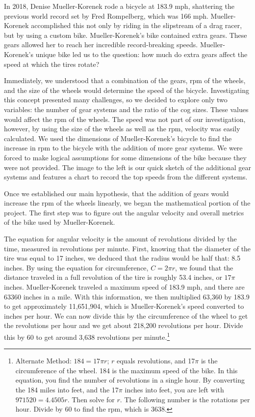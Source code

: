 In 2018, Denise Mueller-Korenek rode a bicycle at 183.9 mph, shattering the previous world record set by Fred Rompelberg, which was 166 mph. Mueller-Korenek accomplished this not only by riding in the slipstream of a drag racer, but by using a custom bike.  Mueller-Korenek’s bike contained extra gears. These gears allowed her to reach her incredible record-breaking speeds. Mueller-Korenek’s unique bike led us to the question: how much do  extra gears affect the speed at which the tires rotate?

Immediately, we understood that a combination of the gears, rpm of the wheels, and the size of the wheels would determine the speed of the bicycle. Investigating this concept presented  many challenges, so we decided to explore only two variables: the number of gear systems and  the ratio of the cog sizes. These values would affect the rpm of the wheels. The speed was not part of our investigation, however, by using the size of the wheels as well as the rpm, velocity  was easily calculated. We used the dimensions of Mueller-Korenek’s bicycle to find the increase in rpm to the bicycle with the addition of more gear systems. We were forced to make logical assumptions for some dimensions of the bike because they were not provided. The image to the left is our quick sketch of the additional gear systems and features a chart to record the top  speeds from the different systems. 

Once we established our main hypothesis, that the addition of gears would increase the rpm of the wheels linearly, we began the mathematical portion of the project. The first step was to figure out the angular velocity and overall metrics of the bike used by Mueller-Korenek.

The equation for angular velocity is the amount of revolutions divided by the time, measured in revolutions per minute. First, knowing that the diameter of the tire was equal to 17 inches, we deduced that the radius would be half that: 8.5 inches. By using the equation for circumference, $C=2 \pi r$, we found that the distance traveled in a full revolution of the tire is roughly 53.4 inches, or $17\pi$ inches. Mueller-Korenek traveled a maximum speed of 183.9 mph, and there are 63360 inches in a mile. With this information, we then multiplied 63,360 by 183.9 to get approximately 11,651,904, which is Mueller-Korenek’s speed converted to inches per hour. We can now divide this by the circumference of the wheel to get the revolutions per hour and we get about 218,200 revolutions per hour. Divide this by 60 to get around 3,638  revolutions per minute.\footnote{Alternate Method: $184=17 \pi r$; $r$ equals revolutions, and 17$\pi$ is the circumference of the wheel. 184 is the maximum speed of the bike. In this equation, you find the number of revolutions in a single hour. By converting the 184 miles into feet, and the 17$\pi$ inches into feet, you are left with $971520=4.4505r$. Then solve for $r$. The following number is the rotations per hour. Divide by 60 to find the rpm, which is 3638.}

